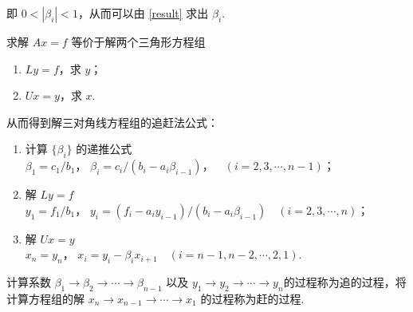 即 $0 < \left|\beta_i\right| < 1$，从而可以由 \eqref{result} 求出 $\beta_i$.

求解 $Ax=f$ 等价于解两个三角形方程组

\begin{enumerate}
    \item $Ly=f$，求 $y$；
    \item $Ux=y$，求 $x$.
\end{enumerate}

从而得到解三对角线方程组的追赶法公式：

\begin{enumerate}
    \item 计算 $\{\beta_i\}$ 的递推公式 \\
          $\beta_1 = c_1 / b_1$，
          $\beta_i = c_i / (b_i - a_i\beta_{i-1})$，$\quad(i=2,3,\cdots,n-1)$；
    \item 解 $Ly = f$ \\
          $y_1 = f_1 / b_1$，
          $y_i = (f_i - a_iy_{i-1}) / (b_i - a_i\beta_{i-1})\quad(i=2,3,\cdots,n)$；
    \item 解 $Ux = y$ \\
          $x_n = y_n$，
          $x_i = y_i - \beta_ix_{i+1}\quad(i=n-1,n-2,\cdots,2,1)$.
\end{enumerate}

计算系数 $\beta_1 \rightarrow \beta_2 \rightarrow \cdots \rightarrow \beta_{n-1}$ 以及 $y_1 \rightarrow y_2 \rightarrow \cdots \rightarrow y_n$的过程称为追的过程，将计算方程组的解 $x_n \rightarrow x_{n-1} \rightarrow \cdots \rightarrow x_1$ 的过程称为赶的过程.
